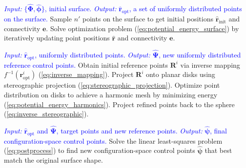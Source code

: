 \documentclass[journal]{IEEEtran}
\theoremstyle{definition}
\begin{document}
\begin{algorithm}[t]
  \caption{Surface Reconstruction Algorithm}
  \label{ag:reconstruction}

  \BlankLine

  \LabelA{}
  \textcolor{blue}{\textit{Input:} $\{\hat{\mathbf{\Phi}}, \hat{\boldsymbol{\phi}}\}$, initial surface.}\;
  \textcolor{blue}{\textit{Output:} $\hat{\mathbf{r}}_\text{opt}$, a set of uniformly distributed points on the surface.}\;
  Sample $n'$ points on the surface to get initial positions $\hat{\mathbf{r}}_\text{init}$ and connectivity $\mathbf{e}$.\;
  Solve optimization problem (\ref{eq:potential_energy_surface}) by iteratively updating point positions $\hat{\mathbf{r}}$ and connectivity $\mathbf{e}$.\;
  \BlankLine

  \LabelB{}
  \textcolor{blue}{\textit{Input:} $\hat{\mathbf{r}}_\text{opt}$, uniformly distributed points.}\;  
  \textcolor{blue}{\textit{Output:} $\hat{\mathbf{\Psi}}$, new uniformly distributed reference control points.}\;
  Obtain initial reference points $\mathbf{R}^i$ via inverse mapping $f^{-1}(\mathbf{r}^i_\text{opt})$ (\ref{eq:inverse_mapping}).\;
  Project $\mathbf{R}^i$ onto planar disks using stereographic projection (\ref{eq:stereographic_projection}).\;
  Optimize point distribution on disks to achieve a harmonic mesh by minimizing energy (\ref{eq:potential_energy_harmonics}).\;
  Project refined points back to the sphere (\ref{eq:inverse_stereographic}).\;
  \BlankLine

  \LabelC{}
  \textcolor{blue}{\textit{Input:} $\hat{\mathbf{r}}_\text{opt}$ and $\hat{\mathbf{\Psi}}$, target points and new reference points.}\;
  \textcolor{blue}{\textit{Output:} $\hat{\boldsymbol{\psi}}$, final configuration-space control points.}\;
  Solve the linear least-squares problem (\ref{eq:postprocess}) to find new configuration-space control points $\hat{\boldsymbol{\psi}}$ that best match the original surface shape.\;
\end{algorithm}
\end{document}
